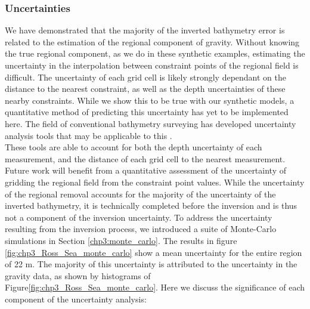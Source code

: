 \subsubsection{Uncertainties}
We have demonstrated that the majority of the inverted bathymetry error is related to the estimation of the regional component of gravity. Without knowing the true regional component, as we do in these synthetic examples, estimating the uncertainty in the interpolation between constraint points of the regional field is difficult. The uncertainty of each grid cell is likely strongly dependant on the distance to the nearest constraint, as well as the depth uncertainties of these nearby constraints. While we show this to be true with our synthetic models, a quantitative method of predicting this uncertainty has yet to be implemented here. The field of conventional bathymetry surveying has developed uncertainty analysis tools that may be applicable to this \citep{bourgeoisachieving2016}. \\

These tools are able to account for both the depth uncertainty of each measurement, and the distance of each grid cell to the nearest measurement. Future work will benefit from a quantitative assessment of the uncertainty of gridding the regional field from the constraint point values. While the uncertainty of the regional removal accounts for the majority of the uncertainty of the inverted bathymetry, it is technically completed before the inversion and is thus not a component of the inversion uncertainty. To address the uncertainty resulting from the inversion process, we introduced a suite of Monte-Carlo simulations in Section \ref{chp3:monte_carlo}. The results in figure \ref{fig:chp3_Ross_Sea_monte_carlo} show a mean uncertainty for the entire region of 22 m. The majority of this uncertainty is attributed to the uncertainty in the gravity data, as shown by histograms of Figure\ref{fig:chp3_Ross_Sea_monte_carlo}. Here we discuss the significance of each component of the uncertainty analysis:

